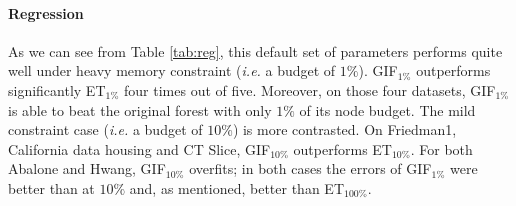 \documentclass{article}
\begin{document}
\paragraph{Regression}
As we can see from Table \ref{tab:reg}, this default set of parameters performs 
quite well under heavy memory constraint ({\it i.e.} a budget of $1\%$). 
GIF$_{1\%}$ outperforms significantly ET$_{1\%}$ four times out of five. 
Moreover, on those four datasets, GIF$_{1\%}$ is able to beat the original 
forest with only $1\%$ of its node budget.
The mild constraint case ({\it i.e.} a budget of $10\%$) is more contrasted.
On Friedman1, California data housing and CT Slice, GIF$_{10\%}$ 
outperforms ET$_{10\%}$. For both Abalone and Hwang, GIF$_{10\%}$ overfits; in 
both cases the errors of GIF$_{1\%}$ were better than at $10\%$ and, 
as mentioned, better than ET$_{100\%}$.
\end{document}
